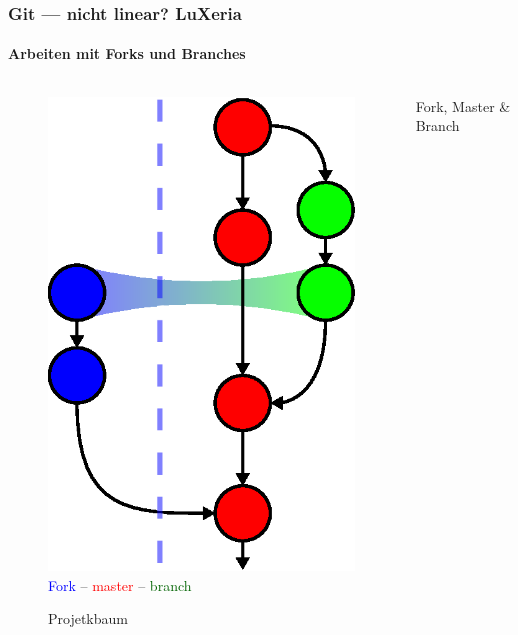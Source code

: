 \begin{frame}
	\frametitle{Git --- nicht linear?\hfill{} LuXeria}
	\framesubtitle{Arbeiten mit Forks und Branches}
	\begin{columns}
		\begin{column}{5cm}
			\begin{figure}
				\includegraphics[scale=0.5]{git_tree.eps}\\
				\textcolor{blue}{Fork} -- \textcolor{red}{master} -- \textcolor{darkgreen}{branch}
				\caption{Projetkbaum}
			\end{figure}
		\end{column}
		\begin{column}{5cm}
			\begin{block}{Fork, Master \& Branch}
				\begin{itemize}

\end{itemize}
\end{block}
\end{column}
\end{columns}
\end{frame}
